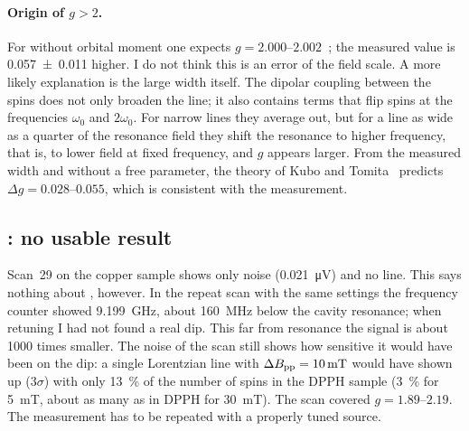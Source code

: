 \paragraph{Origin of \texorpdfstring{$g>2$}{g > 2}.}
For  without orbital moment one expects $g=\numrange{2.000}{2.002}$~\cite{abragam1970}; the measured value is
\num{0.057(11)} higher. I do not think this is an error of the field scale. A more likely explanation is the large width itself. The dipolar
coupling between the spins does not only broaden the line; it also contains terms that flip spins at the frequencies $\omega_0$
and $2\omega_0$. For narrow lines they average out, but for a line as wide as a quarter of the resonance field they shift
the resonance to higher frequency, that is, to lower field at fixed frequency, and $g$ appears larger. From the measured
width and without a free parameter, the theory of Kubo and Tomita~\cite{kubo1954} predicts $\Delta g=\numrange{0.028}{0.055}$,
which is consistent with the measurement.

\subsection{\texorpdfstring{}{Cu2+}: no usable result}\label{sec:cu}
Scan~29 on the copper sample shows only noise (\qty{0.021}{\micro V}) and no line. This says nothing about ,
however. In the repeat scan with the same settings the frequency counter showed \qty{9.199}{GHz}, about \qty{160}{MHz}
below the cavity resonance; when retuning I had not found a real dip. This far from resonance the signal is about 1000
times smaller. The noise of the scan still shows how sensitive it would have been on the dip: a single Lorentzian line
with $\Delta B_\mathrm{pp}=\qty{10}{mT}$ would have shown up ($3\sigma$) with only \qty{13}{\percent} of the number of spins in the DPPH
sample (\qty{3}{\percent} for \qty{5}{mT}, about as many as in DPPH for \qty{30}{mT}). The scan covered
$g=\numrange{1.89}{2.19}$. The measurement has to be repeated with a properly tuned source.
